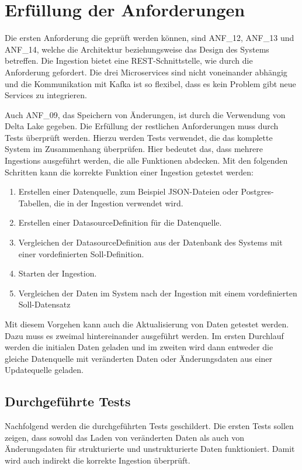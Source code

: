 \section{Erfüllung der Anforderungen}

Die ersten Anforderung die geprüft werden können, sind ANF\_12, ANF\_13 und ANF\_14, welche die Architektur beziehungsweise das Design des Systems betreffen.
Die Ingestion bietet eine REST-Schnittstelle, wie durch die Anforderung gefordert.
Die drei Microservices sind nicht voneinander abhängig und die Kommunikation mit Kafka ist so flexibel, dass es kein Problem gibt neue Services zu integrieren.

Auch ANF\_09, das Speichern von Änderungen, ist durch die Verwendung von Delta Lake gegeben.
Die Erfüllung der restlichen Anforderungen muss durch Tests überprüft werden.
Hierzu werden Tests verwendet, die das komplette System im Zusammenhang überprüfen.
Hier bedeutet das, dass mehrere Ingestions ausgeführt werden, die alle Funktionen abdecken.
Mit den folgenden Schritten kann die korrekte Funktion einer Ingestion getestet werden: \begin{enumerate}
    \item Erstellen einer Datenquelle, zum Beispiel JSON-Dateien oder Postgres-Ta\-bellen, die in der Ingestion verwendet wird.
    \item Erstellen einer DatasourceDefinition für die Datenquelle.
    \item Vergleichen der DatasourceDefinition aus der Datenbank des Systems mit einer vordefinierten Soll-Definition.
    \item Starten der Ingestion.
    \item Vergleichen der Daten im System nach der Ingestion mit einem vordefinierten Soll-Datensatz
\end{enumerate}
Mit diesem Vorgehen kann auch die Aktualisierung von Daten getestet werden.
Dazu muss es zweimal hintereinander ausgeführt werden.
Im ersten Durchlauf werden die initialen Daten geladen und im zweiten wird dann entweder die gleiche Datenquelle mit veränderten Daten oder Änderungsdaten aus einer Updatequelle geladen.

\subsection{Durchgeführte Tests}
\label{sec:tests-actual}
Nachfolgend werden die durchgeführten Tests geschildert.
Die ersten Tests sollen zeigen, dass sowohl das Laden von veränderten Daten als auch von Änderungsdaten für strukturierte und unstrukturierte Daten funktioniert.
Damit wird auch indirekt die korrekte Ingestion überprüft.

